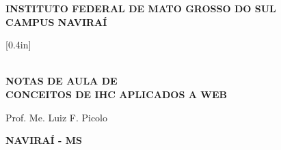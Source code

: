 \thispagestyle{empty}

\vfill
 \begin{center}
    
    {\large\bfseries INSTITUTO FEDERAL DE MATO GROSSO DO SUL} \\
    
    {\large\bfseries CAMPUS NAVIRAÍ}  \\ 

    \vspace*{1in}
    \begin{large} \end{large}[0.4in] \newline

    \vspace*{4cm}
    \noindent \\
    
    \large\bfseries{NOTAS DE AULA DE} \\
    \huge\bfseries{CONCEITOS DE IHC APLICADOS A WEB} \\
    
    \vspace*{4cm}
    
    \large{Prof. Me. Luiz F. Picolo}
    
    \vfill
    \large\bfseries{ NAVIRAÍ - MS}
\end{center}

\normalsize


